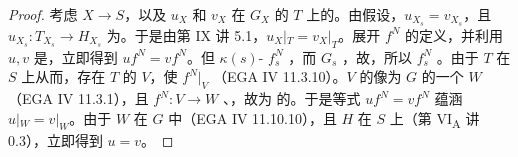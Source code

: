 \begin{proof}
考虑 $X\to S$，以及 $u_X$ 和 $v_X$ 在 $G_X$ 的 $T$ 上的。由假设，$u_{X_s}=v_{X_s}$，且 $u_{X_s}:T_{X_s}\to H_{X_s}$ 为。于是由第 IX 讲 5.1，$u_X|_T=v_X|_T$。展开 $f^N$ 的定义，并利用 $u,v$ 是，立即得到 $uf^N=vf^N$。但 $\kappa(s)$- $f_s^N$ ，而 $G_s$ ，故，所以 $f_s^N$ 。由于 $T$ 在 $S$ 上从而，存在 $T$ 的 $V$，使 $f^N|_V$ （EGA IV 11.3.10）。$V$ 的像为 $G$ 的一个 $W$（EGA IV 11.3.1），且 $f^N:V\to W$ 、，故为 的。于是等式 $uf^N=vf^N$ 蕴涵 $u|_W=v|_W$。由于 $W$ 在
$G$ 中（EGA IV 11.10.10），且 $H$ 在 $S$ 上（第 VI\textsubscript{A} 讲 0.3），立即得到 $u=v$。
\end{proof}
